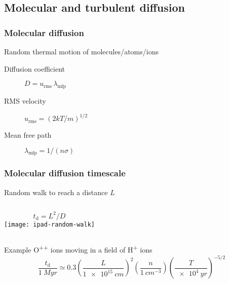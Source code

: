 \documentclass[presentation, compress]{beamer}
\begin{document}
\subsection{Molecular and turbulent diffusion}

\begin{frame}
  \frametitle{Molecular diffusion}
  Random thermal motion of molecules/atoms/ions

  \begin{description}
  \item[Diffusion coefficient] 
    \dotfill{} \(
    D = u_{\mathrm{rms}}\, \lambda_{\mathrm{mfp}}
    \)
  \item[RMS velocity]
    \dotfill{} \(
    u_{\mathrm{rms}} = (2 k T / m)^{1/2}
    \)
  \item[Mean free path] 
    \dotfill{} \(
    \lambda_{\mathrm{mfp}} = 1 / (n \sigma)
    \)
  \end{description}

\end{frame}

\begin{frame}
  \frametitle{Molecular diffusion timescale}
  
  \begin{block}{Random walk to reach a distance \(L\)}
    \bigskip
    \begin{columns}
      \[
      t_\mathrm{d} = L^2 / D
      \]
      \texttt{[image: ipad-random-walk]}
    \end{columns}
  \end{block}
  \begin{block}{Example}
    O\textsuperscript{++} ions moving in a field of H\textsuperscript{+} ions
    \[
    \frac{t_\mathrm{d}}{\SI{1}{Myr}} \simeq 0.3
    \left( \frac{L}{\SI{1e15}{cm}} \right)^2 
    \left( \frac{n}{\SI{1}{cm^{-3}}} \right)
    \left( \frac{T}{\SI{e4}{yr}}  \right)^{-5/2}
    \]
  \end{block}

\end{frame}
\end{document}
